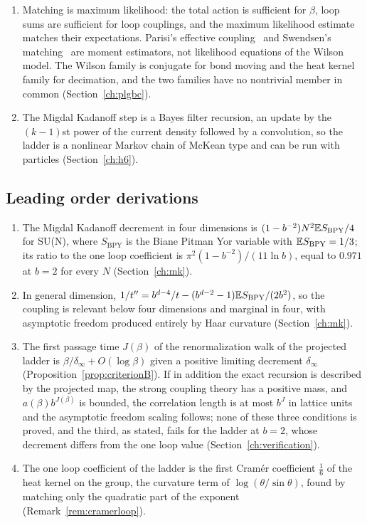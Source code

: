 \begin{enumerate}
\item Matching is maximum likelihood: the total action is sufficient for $\beta$, loop sums are sufficient for loop couplings, and the maximum likelihood estimate matches their expectations. Parisi's effective coupling~\cite{Pa80} and Swendsen's matching~\cite{Sw79} are moment estimators, not likelihood equations of the Wilson model. The Wilson family is conjugate for bond moving and the heat kernel family for decimation, and the two families have no nontrivial member in common (Section~\ref{ch:plgbc}).
\item The Migdal Kadanoff step is a Bayes filter recursion, an update by the $(k-1)$st power of the current density followed by a convolution, so the ladder is a nonlinear Markov chain of McKean type and can be run with particles (Section~\ref{ch:h6}).
\end{enumerate}

\subsection{Leading order derivations}

\begin{enumerate}
\item The Migdal Kadanoff decrement in four dimensions is $(1-b^{-2})N^2\mathbb{E} S_{\mathrm{BPY}}/4$ for SU(N), where $S_{\mathrm{BPY}}$ is the Biane Pitman Yor variable with $\mathbb{E} S_{\mathrm{BPY}}=1/3$; its ratio to the one loop coefficient is $\pi^2(1-b^{-2})/(11\ln b)$, equal to $0.971$ at $b=2$ for every $N$ (Section~\ref{ch:mk}).
\item In general dimension, $1/t''=b^{d-4}/t-(b^{d-2}-1)\mathbb{E} S_{\mathrm{BPY}}/(2b^2)$, so the coupling is relevant below four dimensions and marginal in four, with asymptotic freedom produced entirely by Haar curvature (Section~\ref{ch:mk}).
\item The first passage time $J(\beta)$ of the renormalization walk of the projected ladder is $\beta/\delta_\infty+O(\log\beta)$ given a positive limiting decrement $\delta_\infty$ (Proposition~\ref{prop:criterionB}). If in addition the exact recursion is described by the projected map, the strong coupling theory has a positive mass, and $a(\beta)b^{J(\beta)}$ is bounded, the correlation length is at most $b^{J}$ in lattice units and the asymptotic freedom scaling follows; none of these three conditions is proved, and the third, as stated, fails for the ladder at $b=2$, whose decrement differs from the one loop value (Section~\ref{ch:verification}).
\item The one loop coefficient of the ladder is the first Cram\'er coefficient $\frac16$ of the heat kernel on the group, the curvature term of $\log(\theta/\sin\theta)$, found by matching only the quadratic part of the exponent (Remark~\ref{rem:cramerloop}).
\end{enumerate}

